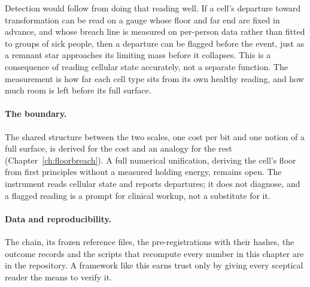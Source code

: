 Detection would follow from doing that reading well. If a cell's departure toward transformation can be read on a gauge whose floor and
far end are fixed in advance, and whose breach line is measured on per-person data rather than fitted to groups of sick people, then a
departure can be flagged before the event, just as a remnant star approaches its limiting mass before it collapses. \prediction{} This is
a consequence of reading cellular state accurately, not a separate function. The measurement is how far each cell type sits from its own
healthy reading, and how much room is left before its full surface. \interp

\paragraph{The boundary.} The shared structure between the two scales, one cost per bit and one notion of a full surface, is derived for
the cost and an analogy for the rest (Chapter~\ref{ch:floorbreach}). A full numerical unification, deriving the cell's floor from first
principles without a measured holding energy, remains open. \openprob{} The instrument reads cellular state and reports departures; it
does not diagnose, and a flagged reading is a prompt for clinical workup, not a substitute for it.

\paragraph{Data and reproducibility.} The chain, its frozen reference files, the pre-registrations with their hashes, the outcome records
and the scripts that recompute every number in this chapter
are in the repository. A framework like this earns trust only by giving every sceptical reader the means to verify it.
